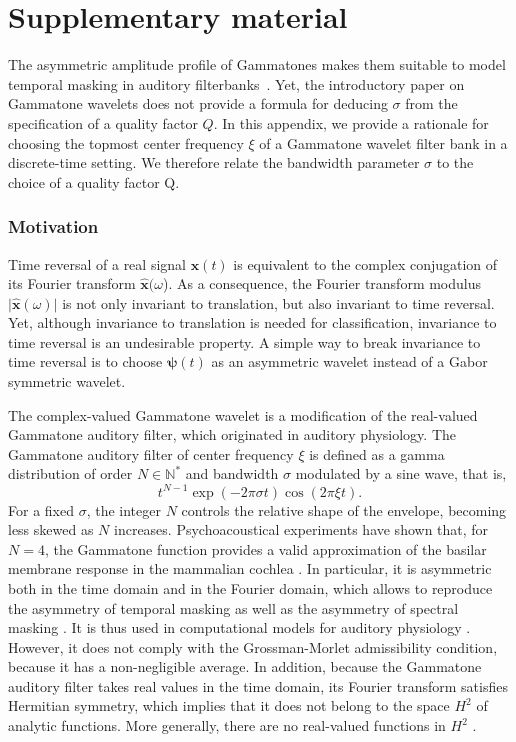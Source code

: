 \documentclass[smallextended]{svjour3}
\begin{document}
\section*{Supplementary material}

The asymmetric amplitude profile of Gammatones makes them suitable to model temporal masking in auditory filterbanks~\cite{Fastl2007}.
Yet, the introductory paper on Gammatone wavelets \cite{Venkitaraman2014} does not provide a formula for deducing $\sigma$ from the specification of a quality factor $Q$.
In this appendix, we provide a rationale for choosing the topmost center frequency $\xi$ of a Gammatone wavelet filter bank in a discrete-time setting.
We therefore relate the bandwidth parameter $\sigma$ to the choice of a quality factor Q.


\subsubsection*{Motivation}
Time reversal of a real signal $\boldsymbol{x}(t)$ is equivalent
to the complex conjugation of its Fourier transform $\boldsymbol{\widehat{x}}(\omega$).
As a consequence, the Fourier transform modulus $\vert\boldsymbol{\widehat{x}}(\omega)\vert$
is not only invariant to translation, but also invariant to time reversal.
Yet, although invariance to translation is needed for classification,
invariance to time reversal is an undesirable property.
A simple way to break invariance to time reversal is to choose $\boldsymbol{\psi}(t)$
as an asymmetric wavelet instead of a Gabor symmetric wavelet.

The complex-valued Gammatone wavelet is a modification of the real-valued
Gammatone auditory filter, which originated in auditory physiology. The
Gammatone auditory filter of center frequency $\xi$ is defined
as a gamma distribution of order $N\in\mathbb{N}^{*}$ and bandwidth
$\sigma$ modulated by a sine wave, that is,
\[
t^{N-1}\exp(-2\pi\sigma t)\cos(2\pi \xi t).
\]
For a fixed $\sigma$, the integer $N$ controls the relative shape
of the envelope, becoming less skewed as $N$ increases. Psychoacoustical
experiments have shown that, for $N=4$, the Gammatone function provides
a valid approximation of the basilar membrane response in the mammalian
cochlea \cite{Flanagan1960,Patterson1976,Lyon2010}. In particular,
it is asymmetric both in the time domain and in the Fourier domain,
which allows to reproduce the asymmetry of temporal masking as well
as the asymmetry of spectral masking \cite{Fastl2007}. It is thus
used in computational models for auditory physiology \cite{Pressnitzer2005}.
However, it does not comply with the Grossman-Morlet admissibility
condition, because it has a non-negligible average. In addition, because
the Gammatone auditory filter takes real values in the time domain,
its Fourier transform satisfies Hermitian symmetry, which implies
that it does not belong to the space $H^{2}$ of analytic functions.
More generally, there are no real-valued functions in $H^{2}$ \cite{Grossmann1984}.
\end{document}

